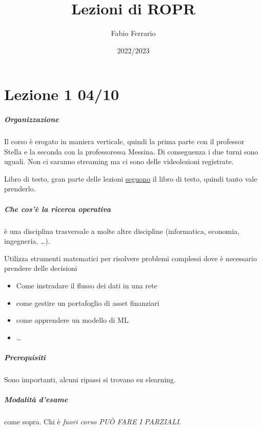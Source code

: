 \documentclass[12pt, a4paper, openany]{book}
\begin{document}
\title{Lezioni di ROPR}
\author{Fabio Ferrario}
\date{2022/2023}
\maketitle

\tableofcontents

\chapter{Lezione 1 04/10}
\paragraph*{Organizzazione}Il corso è erogato in maniera verticale, quindi la prima parte con il professor Stella e la seconda con la professoressa Messina.
Di conseguenza i due turni sono uguali. Non ci saranno streaming ma ci sono delle videolezioni registrate.

Libro di testo, gran parte delle lezioni \underline{seguono} il libro di testo, quindi tanto vale prenderlo. 

\paragraph*{Che cos'è la ricerca operativa}
è una disciplina trasversale a molte altre discipline (informatica, economia, ingegneria, \dots).

Utilizza strumenti matematici per risolvere problemi complessi dove è necessario prendere delle decisioni
\begin{itemize}
    \item Come instradare il flusso dei dati in una rete
    \item come gestire un portafoglio di asset finanziari
    \item come apprendere un modello di ML
    \item \dots
\end{itemize}

\paragraph*{Prerequisiti} Sono importanti, alcuni ripassi si trovano su elearning.
\paragraph*{Modalità d'esame} come sopra. Chi è \emph{fuori corso PUÒ FARE I PARZIALI}.
\end{document}
